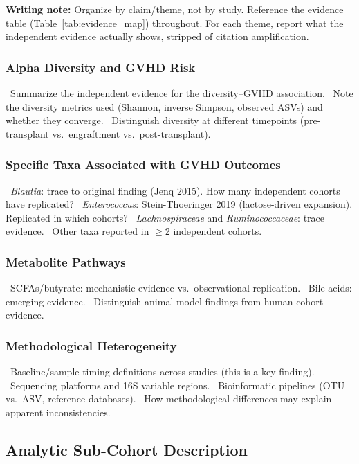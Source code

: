 \documentclass[11pt,a4paper]{article}
\newcommand{\todoitem}[1]{\textcolor{blue!70!black}{\textbullet~#1}}
\newcommand{\writingnote}[1]{\par\noindent\colorbox{yellow!30}{\parbox{\dimexpr\linewidth-2\fboxsep}{%
  \small\textbf{Writing note:} #1}}\par\medskip}
\begin{document}
\writingnote{Organize by claim/theme, not by study. Reference the evidence table (Table~\ref{tab:evidence_map}) throughout. For each theme, report what the independent evidence actually shows, stripped of citation amplification.}

\subsubsection{Alpha Diversity and GVHD Risk}
\todoitem{Summarize the independent evidence for the diversity--GVHD association.}
\todoitem{Note the diversity metrics used (Shannon, inverse Simpson, observed ASVs) and whether they converge.}
\todoitem{Distinguish diversity at different timepoints (pre-transplant vs.\ engraftment vs.\ post-transplant).}

\subsubsection{Specific Taxa Associated with GVHD Outcomes}
\todoitem{\textit{Blautia}: trace to original finding (Jenq 2015). How many independent cohorts have replicated?}
\todoitem{\textit{Enterococcus}: Stein-Thoeringer 2019 (lactose-driven expansion). Replicated in which cohorts?}
\todoitem{\textit{Lachnospiraceae} and \textit{Ruminococcaceae}: trace evidence.}
\todoitem{Other taxa reported in $\geq$2 independent cohorts.}

\subsubsection{Metabolite Pathways}
\todoitem{SCFAs/butyrate: mechanistic evidence vs.\ observational replication.}
\todoitem{Bile acids: emerging evidence.}
\todoitem{Distinguish animal-model findings from human cohort evidence.}

\subsubsection{Methodological Heterogeneity}
\todoitem{Baseline/sample timing definitions across studies (this is a key finding).}
\todoitem{Sequencing platforms and 16S variable regions.}
\todoitem{Bioinformatic pipelines (OTU vs.\ ASV, reference databases).}
\todoitem{How methodological differences may explain apparent inconsistencies.}


\subsection{Analytic Sub-Cohort Description}
\label{sec:subcohort_results}
\end{document}
